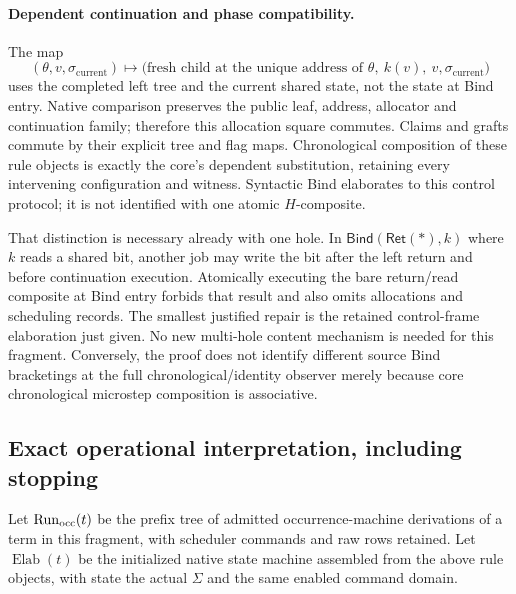 \documentclass[11pt]{article}
\begin{document}
\paragraph{Dependent continuation and phase compatibility.} The map
\[
 (\theta,v,\sigma_{\mathrm{current}})
 \longmapsto
 \bigl(\text{fresh child at the unique address of }\theta,\ k(v),\
        v,\sigma_{\mathrm{current}}\bigr)
\]
uses the completed left tree and the current shared state, not the state at Bind entry. Native comparison preserves the public leaf, address, allocator and continuation family; therefore this allocation square commutes. Claims and grafts commute by their explicit tree and flag maps. Chronological composition of these rule objects is exactly the core's dependent substitution, retaining every intervening configuration and witness. Syntactic Bind elaborates to this control protocol; it is not identified with one atomic $H$-composite.

That distinction is necessary already with one hole. In $\mathsf{Bind}(\mathsf{Ret}(*),k)$ where $k$ reads a shared bit, another job may write the bit after the left return and before continuation execution. Atomically executing the bare return/read composite at Bind entry forbids that result and also omits allocations and scheduling records. The smallest justified repair is the retained control-frame elaboration just given. No new multi-hole content mechanism is needed for this fragment. Conversely, the proof does not identify different source Bind bracketings at the full chronological/identity observer merely because core chronological microstep composition is associative.

\subsection{Exact operational interpretation, including stopping}

Let $\operatorname{Run}_{\rm occ}(t)$ be the prefix tree of admitted occurrence-machine derivations of a term in this fragment, with scheduler commands and raw rows retained. Let $\operatorname{Elab}(t)$ be the initialized native state machine assembled from the above rule objects, with state the actual $\Sigma$ and the same enabled command domain.
\end{document}
